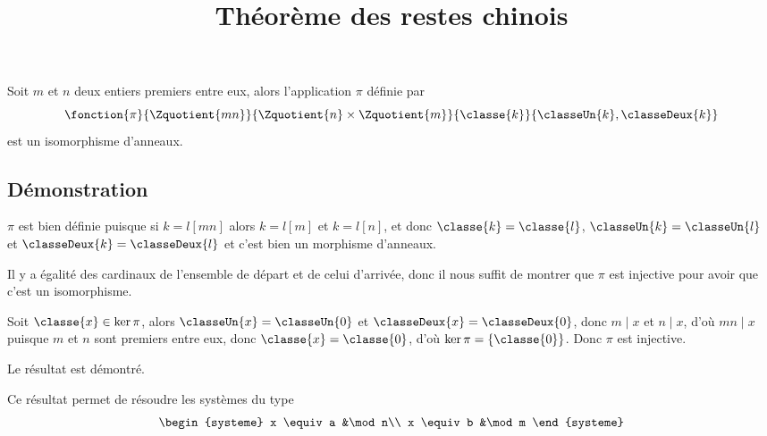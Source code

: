 \documentclass[fontsize=12pt,twoside=false,parskip=half]{scrartcl}
\title{Théorème des restes chinois}
\date{}
\author{}
\begin{document}
\maketitle
   \begin{Theoreme}
      Soit $m$ et $n$ deux entiers premiers entre eux, alors l’application $\pi$
      définie par
      \[
         \fonction{\pi}{\Zquotient{mn}}{\Zquotient{n} \times \Zquotient{m}}{\classe{k}}{\classeUn{k}, \classeDeux{k}}
      \]
      est un isomorphisme d’anneaux.
   \end{Theoreme}
   \subsection{Démonstration}
      $\pi$ est bien définie puisque si $k = l [mn]$ alors $k = l[m]$ et $k = l[n]$, et donc $\classe{k} = \classe{l}$,
      $\classeUn{k} = \classeUn{l}$ et $\classeDeux{k} = \classeDeux{l}$ et c’est bien un morphisme d’anneaux.
      
      Il y a égalité des cardinaux de l’ensemble de départ et de celui d’arrivée, donc il nous suffit de montrer que
      $\pi$ est injective pour avoir que c’est un isomorphisme.
      
      Soit $\classe{x} \in \ker \pi$, alors $\classeUn{x} = \classeUn{0}$ et $\classeDeux{x} = \classeDeux{0}$, donc
      $m \mid x$ et $n \mid x$, d’où $mn \mid x$ puisque $m$ et $n$ sont premiers entre eux, donc $\classe{x} = \classe{0}$,
      d’où $\ker \pi = \left\{\classe{0}\right\}$. Donc $\pi$ est injective.
      
      Le résultat est démontré.
      
      Ce résultat permet de résoudre les systèmes du type
      \[
         \begin{systeme}
            x \equiv a &\mod n\\
            x \equiv b &\mod m
         \end{systeme}
      \]
\end{document}
